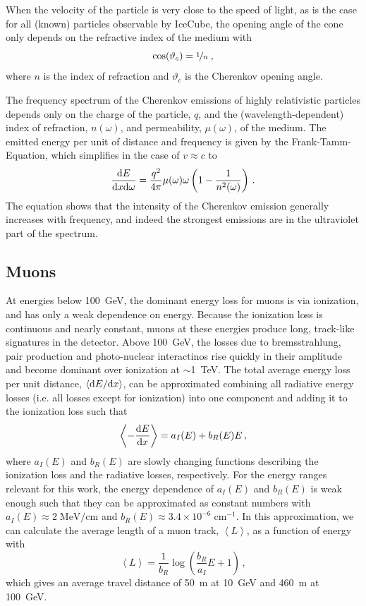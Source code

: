 When the velocity of the particle is very close to the speed of light, as is the case for all (known) particles observable by IceCube, the opening angle of the cone only depends on the refractive index of the medium with
\begin{equation}
    \cos(\vartheta_c)=\nicefrac{1}{n}\;,
\end{equation}
where $n$ is the index of refraction and $\vartheta_c$ is the Cherenkov opening angle.

The frequency spectrum of the Cherenkov emissions of highly relativistic particles depends only on the charge of the particle, $q$, and the (wavelength-dependent) index of refraction, $n(\omega)$, and permeability, $\mu(\omega)$, of the medium. The emitted energy per unit of distance and frequency is given by the Frank-Tamm-Equation, which simplifies in the case of $v\approx c$ to
\begin{equation}
    \frac{\mathrm{d} E}{\mathrm{d} x \mathrm{d} \omega}=\frac{q^2}{4\pi}\mu(\omega)\omega\left(1-\frac{1}{n^2(\omega)}\right)\,.
\end{equation}
The equation shows that the intensity of the Cherenkov emission generally increases with frequency, and indeed the strongest emissions are in the ultraviolet part of the spectrum.

\subsection{Muons}
\label{sec:muon-propagation}
At energies below 100~GeV, the dominant energy loss for muons is via ionization, and has only a weak dependence on energy. Because the ionization loss is continuous and nearly constant, muons at these energies produce long, track-like signatures in the detector. Above 100~GeV, the losses due to bremsstrahlung, pair production and photo-nuclear interactinos rise quickly in their amplitude and become dominant over ionization at $\sim$1~TeV. The total average energy loss per unit distance, $\left<\mathrm{d} E/\mathrm{d} x\right>$, can be approximated combining all radiative energy losses (i.e. all losses except for ionization) into one component and adding it to the ionization loss such that
\begin{equation}
    \left<-\frac{\mathrm{d} E}{\mathrm{d} x}\right> = a_I(E) + b_R(E)E\,,
\end{equation}
where $a_I(E)$ and $b_R(E)$ are slowly changing functions describing the ionization loss and the radiative losses, respectively\cite{muonstoppingpower}. For the energy ranges relevant for this work, the energy dependence of $a_I(E)$ and $b_R(E)$ is weak enough such that they can be approximated as constant numbers with $a_I(E)\approx 2\;\mathrm{MeV/cm}$ and $b_R(E)\approx3.4\times10^{-6}\;\mathrm{cm^{-1}}$\cite{muonstoppingpower}. In this approximation, we can calculate the average length of a muon track, $\left<L\right>$, as a function of energy with
\begin{equation}
    \left<L\right>=\frac{1}{b_R}\log\left(\frac{b_R}{a_I}E + 1\right)\,,
\end{equation}
which gives an average travel distance of 50~m at 10~GeV and 460~m at 100~GeV.

